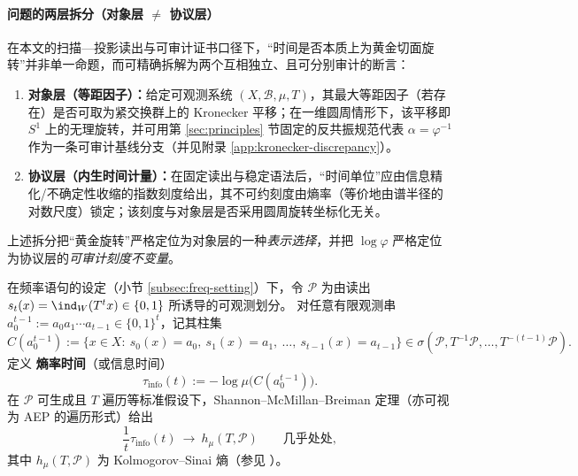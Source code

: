 \paragraph{问题的两层拆分（对象层 \texorpdfstring{$\neq$}{≠} 协议层）}
在本文的扫描—投影读出与可审计证书口径下，“时间是否本质上为黄金切面旋转”并非单一命题，而可精确拆解为两个互相独立、且可分别审计的断言：
\begin{enumerate}
  \item \textbf{对象层（等距因子）：}给定可观测系统 \((X,\mathcal{B},\mu,T)\)，其最大等距因子（若存在）是否可取为紧交换群上的 Kronecker 平移；在一维圆周情形下，该平移即 \(S^1\) 上的无理旋转，并可用第 \ref{sec:principles} 节固定的反共振规范代表 \(\alpha=\varphi^{-1}\) 作为一条可审计基线分支（并见附录 \ref{app:kronecker-discrepancy}）。
  \item \textbf{协议层（内生时间计量）：}在固定读出与稳定语法后，“时间单位”应由信息精化/不确定性收缩的指数刻度给出，其不可约刻度由熵率（等价地由谱半径的对数尺度）锁定；该刻度与对象层是否采用圆周旋转坐标化无关。
\end{enumerate}
上述拆分把“黄金旋转”严格定位为对象层的一种\emph{表示选择}，并把 \(\log\varphi\) 严格定位为协议层的\emph{可审计刻度不变量}。
\par

\begin{definition}\label{def:entropy-rate-time}
在频率语句的设定（小节 \ref{subsec:freq-setting}）下，令 \(\mathcal{P}\) 为由读出 \(s_t(x)=\ind_W(T^t x)\in\{0,1\}\) 所诱导的可观测划分。
对任意有限观测串 \(a_0^{t-1}:=a_0a_1\cdots a_{t-1}\in\{0,1\}^t\)，记其柱集
\[
C(a_0^{t-1})
:=\bigl\{x\in X:\ s_0(x)=a_0,\ s_1(x)=a_1,\ \dots,\ s_{t-1}(x)=a_{t-1}\bigr\}\in\sigma(\mathcal{P},T^{-1}\mathcal{P},\dots,T^{-(t-1)}\mathcal{P}).
\]
定义 \textbf{熵率时间}（或信息时间）
\[
\tau_{\mathrm{info}}(t)
:=-\log \mu\bigl(C(a_0^{t-1})\bigr).
\]
在 \(\mathcal{P}\) 可生成且 \(T\) 遍历等标准假设下，Shannon--McMillan--Breiman 定理（亦可视为 AEP 的遍历形式）给出
\[
\frac{1}{t}\tau_{\mathrm{info}}(t)\ \longrightarrow\ h_\mu(T,\mathcal{P})
\qquad\text{几乎处处},
\]
其中 \(h_\mu(T,\mathcal{P})\) 为 Kolmogorov--Sinai 熵（参见 \cite{WaltersErgodicTheory,CoverThomas2006}）。
\end{definition}

